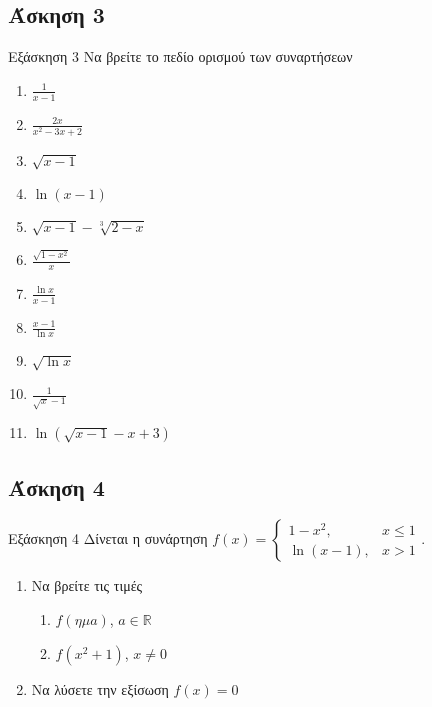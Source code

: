 \documentclass[greek]{beamer}
\begin{document}
\subsection{Άσκηση 3}
\begin{frame}[label=Άσκηση3,t]{Εξάσκηση 3}
      Να βρείτε το πεδίο ορισμού των συναρτήσεων
      \begin{enumerate}
            \item<1-> $\frac{1}{x-1}$
            \item<2-> $\frac{2x}{x^2-3x+2}$
            \item<3-> $\sqrt{x-1}$
            \item<4-> $\ln (x-1)$
            \item<5-> $\sqrt{x-1}-\sqrt[3]{2-x}$
            \item<6-> $\frac{\sqrt{1-x^2}}{x}$
            \item<7-> $\frac{\ln x}{x-1}$
            \item<8-> $\frac{x-1}{\ln x}$
            \item<9-> $\sqrt{\ln x}$
            \item<10-> $\frac{1}{\sqrt{x}-1}$
            \item<11-> $\ln \left(\sqrt{x-1}-x+3\right)$
      \end{enumerate}
\end{frame}

\subsection{Άσκηση 4}
\begin{frame}[label=Άσκηση4,t]{Εξάσκηση 4}
      Δίνεται η συνάρτηση $f(x)=\begin{cases}
                  1-x^2,     & x\le 1 \\
                  \ln (x-1), & x>1
            \end{cases}$.
      \begin{enumerate}
            \item<1-> Να βρείτε τις τιμές
                  \begin{enumerate}
                        \item<1-> $f(ημ a)$, $a\in\mathbb{R}$
                        \item<2-> $f(x^2+1)$, $x\ne 0$
                  \end{enumerate}
            \item<2-> Να λύσετε την εξίσωση $f(x)=0$
      \end{enumerate}
\end{frame}
\end{document}

